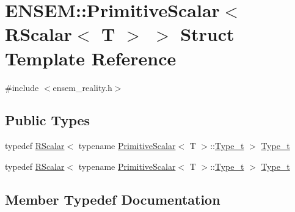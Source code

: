 \hypertarget{structENSEM_1_1PrimitiveScalar_3_01RScalar_3_01T_01_4_01_4}{}\section{E\+N\+S\+EM\+:\+:Primitive\+Scalar$<$ R\+Scalar$<$ T $>$ $>$ Struct Template Reference}
\label{structENSEM_1_1PrimitiveScalar_3_01RScalar_3_01T_01_4_01_4}


{\ttfamily \#include $<$ensem\+\_\+reality.\+h$>$}

\subsection*{Public Types}
\begin{DoxyCompactItemize}
\item 
typedef \mbox{\hyperlink{classENSEM_1_1RScalar}{R\+Scalar}}$<$ typename \mbox{\hyperlink{structENSEM_1_1PrimitiveScalar}{Primitive\+Scalar}}$<$ T $>$\+::\mbox{\hyperlink{structENSEM_1_1PrimitiveScalar_3_01RScalar_3_01T_01_4_01_4_af25173576e04e62938a35f7747631b4f}{Type\+\_\+t}} $>$ \mbox{\hyperlink{structENSEM_1_1PrimitiveScalar_3_01RScalar_3_01T_01_4_01_4_af25173576e04e62938a35f7747631b4f}{Type\+\_\+t}}
\item 
typedef \mbox{\hyperlink{classENSEM_1_1RScalar}{R\+Scalar}}$<$ typename \mbox{\hyperlink{structENSEM_1_1PrimitiveScalar}{Primitive\+Scalar}}$<$ T $>$\+::\mbox{\hyperlink{structENSEM_1_1PrimitiveScalar_3_01RScalar_3_01T_01_4_01_4_af25173576e04e62938a35f7747631b4f}{Type\+\_\+t}} $>$ \mbox{\hyperlink{structENSEM_1_1PrimitiveScalar_3_01RScalar_3_01T_01_4_01_4_af25173576e04e62938a35f7747631b4f}{Type\+\_\+t}}
\end{DoxyCompactItemize}


\subsection{Member Typedef Documentation}
\mbox{\label{structENSEM_1_1PrimitiveScalar_3_01RScalar_3_01T_01_4_01_4_af25173576e04e62938a35f7747631b4f}} 
